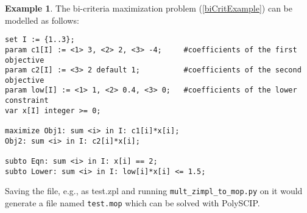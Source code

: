 \documentclass[11pt,listof=totoc]{scrartcl}
\theoremstyle{definition}
\newtheorem{ex}{Example}[section]
\begin{document}
\begin{ex}
  The bi-criteria maximization problem (\ref{biCritExample}) can be
  modelled as follows:
\begin{verbatim}
set I := {1..3};
param c1[I] := <1> 3, <2> 2, <3> -4;     #coefficients of the first objective
param c2[I] := <3> 2 default 1;          #coefficients of the second objective
param low[I] := <1> 1, <2> 0.4, <3> 0;   #coefficients of the lower constraint
var x[I] integer >= 0;

maximize Obj1: sum <i> in I: c1[i]*x[i];
Obj2: sum <i> in I: c2[i]*x[i];

subto Eqn: sum <i> in I: x[i] == 2;
subto Lower: sum <i> in I: low[i]*x[i] <= 1.5;
\end{verbatim}

Saving the file, e.g., as test.zpl and running \texttt{mult\_zimpl\_to\_mop.py} on it would generate a file named \texttt{test.mop} which can be solved with PolySCIP.
\end{ex}
\end{document}
